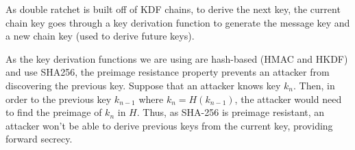 As double ratchet is built off of KDF chains, to derive the next key, the current chain key goes through 
a key derivation function to generate the message key and a new chain key (used to derive future keys).

As the key derivation functions we are using are hash-based (HMAC and HKDF) and use SHA256, the preimage 
resistance property prevents an attacker from discovering the previous key. Suppose that an attacker knows 
key $k_n$. Then, in order to the previous key $k_{n-1}$ where $k_n=H(k_{n-1})$, the attacker would need to find 
the preimage of $k_n$ in $H$. Thus, as SHA-256 is preimage resistant, an attacker won't be able to derive previous 
keys from the current key, providing forward secrecy.
